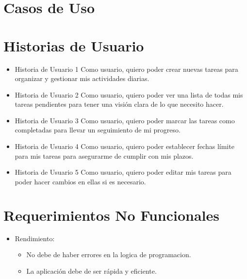 	\section{Casos de Uso}
	 
    
    \section{Historias de Usuario}
    \begin{itemize}
        \item Historia de Usuario 1
        Como usuario, quiero poder crear nuevas tareas para organizar y gestionar mis actividades diarias.
        
        \item Historia de Usuario 2
        Como usuario, quiero poder ver una lista de todas mis tareas pendientes para tener una visión clara de lo que necesito hacer.
        
        \item Historia de Usuario 3
        Como usuario, quiero poder marcar las tareas como completadas para llevar un seguimiento de mi progreso.
        
        \item Historia de Usuario 4
        Como usuario, quiero poder establecer fechas límite para mis tareas para asegurarme de cumplir con mis plazos.

        \item Historia de Usuario 5
        Como usuario, quiero poder editar mis tareas para poder hacer cambios en ellas si es necesario.
    \end{itemize}
\section{Requerimientos No Funcionales}
\begin{itemize}
  \item Rendimiento:
    \begin{itemize}
      \item No debe de haber errores en la logica de programacion.
      \item La aplicación debe de ser rápida y eficiente.
    \end{itemize}
\end{itemize}
